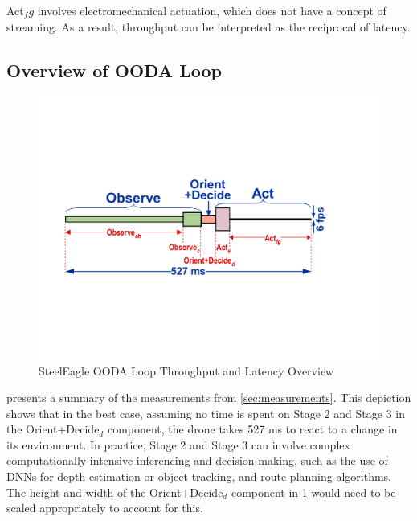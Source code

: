 Act$_fg$ involves electromechanical actuation, which does not have a concept
of streaming. As a result, throughput can be interpreted as the reciprocal of
latency.

\subsection{Overview of OODA Loop}

\begin{figure}[htbp]
    \centerline{\includegraphics[width = .6\textwidth]{figs/fig-ooda-scaling.pdf}}
    \caption{SteelEagle OODA Loop Throughput and Latency Overview}
\label{fig:ooda-scaling}
\end{figure}

 presents a summary of the measurements from
\cref{sec:measurements}. This depiction shows that in the best case, assuming
no time is spent on Stage 2 and Stage 3 in the Orient+Decide$_d$ component, the
drone takes 527 ms to react to a change in its environment. In practice, Stage
2 and Stage 3 can involve complex computationally-intensive inferencing and
decision-making, such as the use of DNNs for depth estimation or object
tracking, and route planning algorithms. The height and width of the
Orient+Decide$_d$ component in \cref{fig:ooda-scaling} would need to be scaled
appropriately to account for this.
